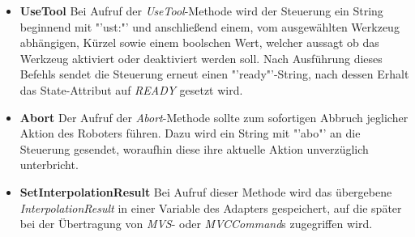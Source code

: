 \begin{itemize}
\item \textbf{UseTool}
\newline
Bei Aufruf der \textit{UseTool}-Methode wird der Steuerung ein String beginnend mit "'ust:"' und anschließend einem, vom ausgewählten Werkzeug abhängigen, Kürzel sowie einem boolschen Wert, welcher aussagt ob das Werkzeug aktiviert oder deaktiviert werden soll. Nach Ausführung dieses Befehls sendet die Steuerung erneut einen "'ready"'-String, nach dessen Erhalt das State-Attribut auf \textit{READY} gesetzt wird. 
\item \textbf{Abort}
\newline
Der Aufruf der \textit{Abort}-Methode sollte zum sofortigen Abbruch jeglicher Aktion des Roboters führen. Dazu wird ein String mit "'abo"' an die Steuerung gesendet, woraufhin diese ihre aktuelle Aktion unverzüglich unterbricht.
\item \textbf{SetInterpolationResult}
\newline
Bei Aufruf dieser Methode wird das übergebene \textit{InterpolationResult} in einer Variable des Adapters gespeichert, auf die später bei der Übertragung von \textit{MVS}- oder \textit{MVCCommand}s zugegriffen wird.
\end{itemize}

